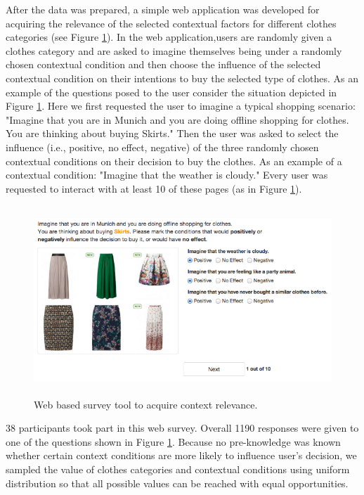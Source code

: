 After the data was prepared, a simple web application was developed for acquiring the relevance of the selected contextual factors for different clothes categories (see Figure \ref{fig:webtool}). In the web application,users are randomly given a clothes category and are asked to imagine themselves being under a randomly chosen contextual condition and then choose the influence of the selected contextual condition on their intentions to buy the selected type of clothes. As an example of the questions posed to the user consider the situation depicted in Figure \ref{fig:webtool}. Here we first requested the user to imagine a typical shopping scenario: "Imagine that you are in Munich and you are doing offline shopping for clothes. You are thinking about buying Skirts." Then the user was asked to select the influence (i.e., positive, no effect, negative) of the three randomly chosen contextual conditions on their decision to buy the clothes. As an example of a contextual condition: "Imagine that the weather is cloudy." Every user was requested to interact with at least 10 of these pages (as in Figure \ref{fig:webtool}). 

\begin{figure}[H]
	\centering
	\includegraphics[height=2.8in]{figures/webtool.png}
	\caption{Web based survey tool to acquire context relevance.}
	\label{fig:webtool}
\end{figure}



38 participants took part in this web survey. Overall 1190 responses were given to one of the questions shown in Figure \ref{fig:webtool}. Because no pre-knowledge was known whether certain context conditions are more likely to influence user's decision, we sampled the value of clothes categories and contextual conditions using uniform distribution so that all possible values can be reached with equal opportunities.


